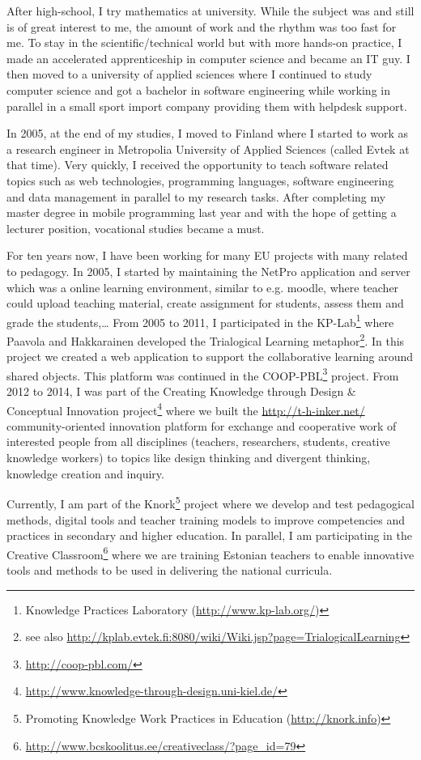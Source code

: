 After high-school, I try mathematics at university. While the subject was and still is of great interest to me, the amount of work and the rhythm was too fast for me. 
To stay in the scientific/technical world but with more hands-on practice, I made an accelerated apprenticeship in computer science and became an IT guy. 
I then moved to a university of applied sciences where I continued to study computer science and got a bachelor in software engineering while working in parallel in a small sport import company providing them with helpdesk support.

In 2005, at the end of my studies, I moved to Finland where I started to work as a research engineer in Metropolia University of Applied Sciences (called Evtek at that time). 
Very quickly, I received the opportunity to teach software related topics such as web technologies, programming languages, software engineering and data management in parallel to my research tasks. 
After completing my master degree in mobile programming last year and with the hope of getting a lecturer position, vocational studies became a must.

For ten years now, I have been working for many EU projects with many related to pedagogy. 
In 2005, I started by maintaining the NetPro application and server which was a online learning environment, similar to e.g. moodle, where teacher could upload teaching material, create assignment for students, assess them and grade the students,\ldots
From 2005 to 2011, I participated in the KP-Lab\footnote{Knowledge Practices Laboratory (\url{http://www.kp-lab.org/})} where Paavola and Hakkarainen \cite{Paavola_2005} developed the Trialogical Learning metaphor\footnote{see also \url{http://kplab.evtek.fi:8080/wiki/Wiki.jsp?page=TrialogicalLearning}}. In this project we created a web application to support the collaborative learning around shared objects.
This platform was continued in the COOP-PBL\footnote{\url{http://coop-pbl.com/}} project.
From 2012 to 2014, I was part of the Creating Knowledge through Design & Conceptual Innovation project\footnote{\url{http://www.knowledge-through-design.uni-kiel.de/}} where we built the \url{http://t-h-inker.net/} community-oriented innovation platform for exchange and cooperative work of interested people from all disciplines (teachers, researchers, students, creative knowledge workers) to topics like design thinking and divergent thinking, knowledge creation and inquiry. 

Currently, I am part of the Knork\footnote{Promoting Knowledge Work Practices in Education (\url{http://knork.info})} project where we develop and test pedagogical methods, digital tools and teacher training models to improve competencies and practices in secondary and higher education. In parallel, I am participating in the Creative Classroom\footnote{\url{http://www.bcskoolitus.ee/creativeclass/?page_id=79}} where we are training Estonian teachers  to enable innovative tools and methods to be used in delivering the national curricula.






  
  
  
  
  